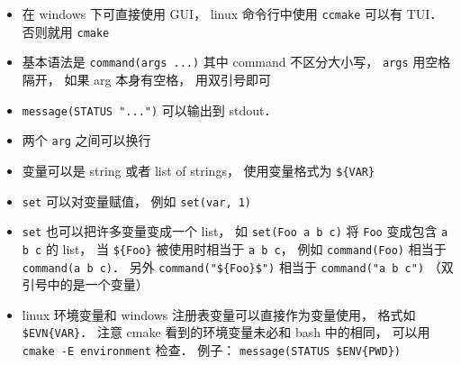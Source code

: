 
\begin{itemize}
\item 在 windows 下可直接使用 GUI， linux 命令行中使用 \verb`ccmake` 可以有 TUI． 否则就用 \verb`cmake`
\item 基本语法是 \verb`command(args ...)` 其中 command 不区分大小写， \verb`args` 用空格隔开， 如果 arg 本身有空格， 用双引号即可
\item \verb`message(STATUS "...")` 可以输出到 stdout．
\item 两个 \verb`arg` 之间可以换行
\item 变量可以是 string 或者 list of strings， 使用变量格式为 \verb`${VAR}`
\item \verb`set` 可以对变量赋值， 例如 \verb`set(var, 1)`
\item \verb`set` 也可以把许多变量变成一个 list， 如 \verb`set(Foo a b c)` 将 \verb`Foo` 变成包含 \verb`a b c` 的 list， 当 \verb`${Foo}` 被使用时相当于 \verb`a b c`， 例如 \verb`command(Foo)` 相当于 \verb`command(a b c)`． 另外 \verb`command("${Foo}$")` 相当于 \verb`command("a b c")` （双引号中的是一个变量）
\item linux 环境变量和 windows 注册表变量可以直接作为变量使用， 格式如 \verb`$EVN{VAR}`． 注意 cmake 看到的环境变量未必和 bash 中的相同， 可以用 \verb`cmake -E environment` 检查． 例子： \verb|message(STATUS $ENV{PWD})|
\end{itemize}

